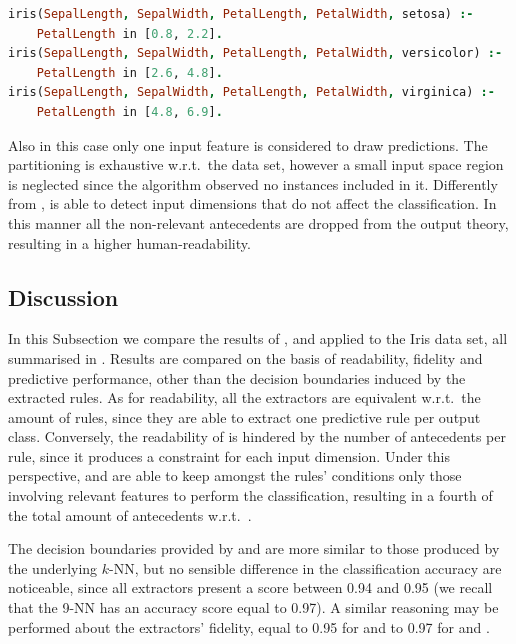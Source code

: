 \documentclass[
]{ceurart}
\begin{document}
\begin{lstlisting}[language=Prolog]
iris(SepalLength, SepalWidth, PetalLength, PetalWidth, setosa) :-
    PetalLength in [0.8, 2.2].
iris(SepalLength, SepalWidth, PetalLength, PetalWidth, versicolor) :-
    PetalLength in [2.6, 4.8].
iris(SepalLength, SepalWidth, PetalLength, PetalWidth, virginica) :-
    PetalLength in [4.8, 6.9].
\end{lstlisting}

Also in this case only one input feature is considered to draw predictions.
%
The partitioning is exhaustive w.r.t.\ the data set, however a small input space region is neglected since the algorithm observed no instances included in it.
%
Differently from \iter{}, \gridex{} is able to detect input dimensions that do not affect the classification.
%
In this manner all the non-relevant antecedents are dropped from the output theory, resulting in a higher human-readability.

\subsection{Discussion}



In this Subsection we compare the results of \cart{}, \iter{} and \gridex{} applied to the Iris data set, all summarised in .
%
Results are compared on the basis of readability, fidelity and predictive performance, other than the decision boundaries induced by the extracted rules.
%
As for readability, all the extractors are equivalent w.r.t.\ the amount of rules, since they are able to extract one predictive rule per output class.
%
Conversely, the readability of \iter{} is hindered by the number of antecedents per rule, since it produces a constraint for each input dimension.
%
Under this perspective, \cart{} and \gridex{} are able to keep amongst the rules' conditions only those involving relevant features to perform the classification, resulting in a fourth of the total amount of antecedents w.r.t.\ \iter{}.

The decision boundaries provided by \gridex{} and \iter{} are more similar to those produced by the underlying $k$-NN, but no sensible difference in the classification accuracy are noticeable, since all extractors present a score between 0.94 and 0.95 (we recall that the 9-NN has an accuracy score equal to 0.97).
%
A similar reasoning may be performed about the extractors' fidelity, equal to 0.95 for \cart{} and to 0.97 for \iter{} and \gridex{}.
\end{document}
